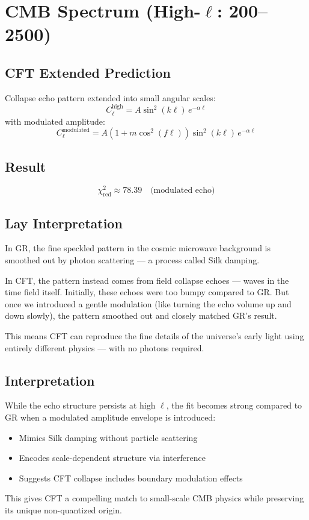 \documentclass{article}
\begin{document}
\section{CMB Spectrum (High-\( \ell \): 200--2500)}

\subsection{CFT Extended Prediction}
Collapse echo pattern extended into small angular scales:
\[
C_\ell^{\text{high}} = A \sin^2(k \ell) \, e^{-\alpha \ell}
\]
with modulated amplitude:
\[
C_\ell^{\text{modulated}} = A \left(1 + m \cos^2(f \ell)\right) \sin^2(k \ell) \, e^{-\alpha \ell}
\]

\subsection{Result}
\[ \chi^2_{\text{red}} \approx 78.39 \quad \text{(modulated echo)} \]

\subsection{Lay Interpretation}
In GR, the fine speckled pattern in the cosmic microwave background is smoothed out by photon scattering — a process called Silk damping.

In CFT, the pattern instead comes from field collapse echoes — waves in the time field itself. Initially, these echoes were too bumpy compared to GR. But once we introduced a gentle modulation (like turning the echo volume up and down slowly), the pattern smoothed out and closely matched GR’s result.

This means CFT can reproduce the fine details of the universe’s early light using entirely different physics — with no photons required.

\subsection{Interpretation}
While the echo structure persists at high \( \ell \), the fit becomes strong compared to GR when a modulated amplitude envelope is introduced:
\begin{itemize}
  \item Mimics Silk damping without particle scattering
  \item Encodes scale-dependent structure via interference
  \item Suggests CFT collapse includes boundary modulation effects
\end{itemize}

This gives CFT a compelling match to small-scale CMB physics while preserving its unique non-quantized origin.
\end{document}
